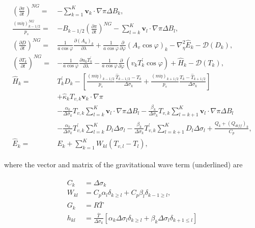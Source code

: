 \begin{eqnarray}
\begin{aligned}
\left(\frac{\partial \pi}{\partial t}\right)^{N G}=&-\sum_{k=1}^{K} \mathbf{v}_{k} \cdot \nabla \pi \Delta B_{k}, \\
\frac{(m \dot{\eta})_{k-1 / 2}^{N G}}{p_{s}}=&-B_{k-1 / 2}\left(\frac{\partial \pi}{\partial t}\right)^{N G}-\sum_{l=k}^{K} \mathbf{v}_{l} \cdot \nabla \pi \Delta B_{l}, \\
\left(\frac{\partial D}{\partial t}\right)^{N G}=& \frac{1}{a \cos \varphi} \frac{\partial\left(A_{u}\right)_{k}}{\partial \lambda}+\frac{1}{a \cos \varphi} \frac{\partial}{\partial \varphi}\left(A_{v} \cos \varphi\right)_{k}-\nabla_{\eta}^{2} \hat{E}_{k}-\mathcal{D}\left(D_{k}\right), \\
\left(\frac{\partial T_{k}}{\partial t}\right)^{N G}=&-\frac{1}{a \cos \varphi} \frac{\partial u_{k} T_{k}^{\prime}}{\partial \lambda}-\frac{1}{a \cos \varphi} \frac{\partial}{\partial \varphi}\left(v_{k} T_{k}^{\prime} \cos \varphi\right)+\hat{H}_{k}-\mathcal{D}\left(T_{k}\right), \\
\hat{H}_{k}=& T_{k}^{\prime} D_{k}-\left[\frac{(m \dot{\eta})_{k-1 / 2}}{p_{s}} \frac{\hat{T}_{k-1 / 2}-T_{k}}{\Delta \sigma_{k}}+\frac{(m \dot{\eta})_{k+1 / 2}}{p_{s}} \frac{T_{k}-\hat{T}_{k+1 / 2}}{\Delta \sigma_{k}}\right] \\
&+\hat{\kappa}_{k} T_{v, k} \mathbf{v}_{k} \cdot \nabla \pi \\
&-\frac{\alpha_{k}}{\Delta \sigma_{k}} T_{v, k} \sum_{l=k}^{K} \mathbf{v}_{l} \cdot \nabla \pi \Delta B_{l}-\frac{\beta_{k}}{\Delta \sigma_{k}} T_{v, k} \sum_{l=k+1}^{K} \mathbf{v}_{l} \cdot \nabla \pi \Delta B_{l} \\
&-\frac{\alpha_{k}}{\Delta \sigma_{k}} T_{v, k}^{\prime} \sum_{l=k}^{K} D_{l} \Delta \sigma_{l}-\frac{\beta_{k}}{\Delta \sigma_{k}} T_{v, k}^{\prime} \sum_{l=k+1}^{K} D_{l} \Delta \sigma_{l}+\frac{Q_{k}+\left(Q_{d i f f}\right)_{k}}{C_{p}}, \\
\hat{E}_{k}=& E_{k}+\sum_{k=1}^{K} W_{k l}\left(T_{v, l}-T_{l}\right),
\end{aligned}
\end{eqnarray}

where the vector and matrix of the gravitational wave term (underlined) are

\begin{eqnarray}
\begin{aligned}
C_{k} &=\Delta \sigma_{k} \\
W_{k l} &=C_{p} \alpha_{l} \delta_{k \geq l}+C_{p} \beta_{l} \delta_{k-1 \geq l}, \\
G_{k} &=R \bar{T} \\
h_{k l} &=\frac{\bar{T}}{\Delta \sigma_{k}}\left[\alpha_{k} \Delta \sigma_{l} \delta_{k \geq l}+\beta_{k} \Delta \sigma_{l} \delta_{k+1 \leq l}\right]
\end{aligned}
\end{eqnarray}

